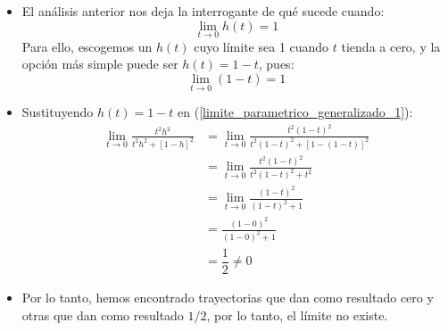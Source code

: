 \begin{itemize}
\begin{enumerate}
        \begin{align*}
        \lim_{t \to 0} \left( \lim_{h \to k}\frac{t^2h^2}{t^2h^2+[1-h]^2} \right) 
         &= \lim_{t \to 0}  \frac{t^2k^2}{t^2k^2+[1-k]^2}=\dfrac{0}{(1-k)^2} 
        \end{align*}
    \end{enumerate}
    \item El análisis anterior nos deja la interrogante de qué sucede cuando:
    \[
    \lim_{t \to 0} h(t) = 1
    \]
    Para ello, escogemos un $h(t)$ cuyo límite sea 1 cuando $t$ tienda a cero, y la opción más simple puede ser $h(t)=1-t$, pues:
    \[
    \lim_{t \to 0} (1-t) = 1
    \]
    \item Sustituyendo $h(t)=1-t$ en (\ref{limite_parametrico_generalizado_1}):
    \begin{align*}
        \lim_{t \to 0}\frac{t^2h^2}{t^2h^2+[1-h]^2} 
         &= \lim_{t \to 0}\frac{t^2(1-t)^2}{t^2(1-t)^2+[1-(1-t)]^2}\\
         &= \lim_{t \to 0}\frac{t^2(1-t)^2}{t^2(1-t)^2+t^2}\\
         &= \lim_{t \to 0}\frac{(1-t)^2}{(1-t)^2+1}\\
         &= \frac{(1-0)^2}{(1-0)^2+1}\\
         &= \dfrac{1}{2}\neq 0
    \end{align*}
    \item Por lo tanto, hemos encontrado trayectorias que dan como resultado cero y otras que dan como resultado $1/2$, por lo tanto, el límite no existe.
\end{itemize}



